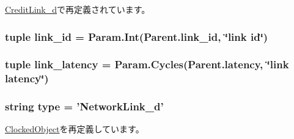 \hyperlink{classGarnetLink__d_1_1CreditLink__d_a17da7064bc5c518791f0c891eff05fda}{CreditLink\_\-d}で再定義されています。\hypertarget{classGarnetLink__d_1_1NetworkLink__d_a68ad93ab49e865b9e80829c3ee7130c7}{
\subsubsection[{link\_\-id}]{\setlength{\rightskip}{0pt plus 5cm}tuple {\bf link\_\-id} = Param.Int(Parent.link\_\-id, \char`\"{}link id\char`\"{})}}
\label{classGarnetLink__d_1_1NetworkLink__d_a68ad93ab49e865b9e80829c3ee7130c7}
\hypertarget{classGarnetLink__d_1_1NetworkLink__d_aee092f519cc5d61dc0287dff3edd11ab}{
\subsubsection[{link\_\-latency}]{\setlength{\rightskip}{0pt plus 5cm}tuple {\bf link\_\-latency} = Param.Cycles(Parent.latency, \char`\"{}link latency\char`\"{})}}
\label{classGarnetLink__d_1_1NetworkLink__d_aee092f519cc5d61dc0287dff3edd11ab}
\hypertarget{classGarnetLink__d_1_1NetworkLink__d_acce15679d830831b0bbe8ebc2a60b2ca}{
\subsubsection[{type}]{\setlength{\rightskip}{0pt plus 5cm}string {\bf type} = '{\bf NetworkLink\_\-d}'}}
\label{classGarnetLink__d_1_1NetworkLink__d_acce15679d830831b0bbe8ebc2a60b2ca}


\hyperlink{classClockedObject_1_1ClockedObject_acce15679d830831b0bbe8ebc2a60b2ca}{ClockedObject}を再定義しています。

